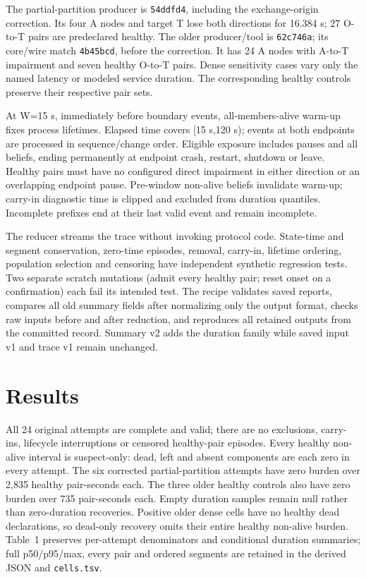 \documentclass[10pt]{article}
\begin{document}
The partial-partition producer is \texttt{54ddfd4}, including the exchange-origin
correction. Its four A nodes and target T lose both directions for 16.384 s;
27 O-to-T pairs are predeclared healthy. The older producer/tool is
\texttt{62c746a}; its core/wire match \texttt{4b45bcd}, before the correction.
It has 24 A nodes with A-to-T impairment and seven healthy O-to-T pairs. Dense
sensitivity cases vary only the named latency or modeled service duration.
The corresponding healthy controls preserve their respective pair sets.

At W=15 s, immediately before boundary events, all-members-alive warm-up fixes
process lifetimes. Elapsed time covers [15 s,120 s); events at both endpoints
are processed in sequence/change order. Eligible exposure includes pauses and
all beliefs, ending permanently at endpoint crash, restart, shutdown or leave.
Healthy pairs must have no configured direct impairment in either direction or
an overlapping endpoint pause. Pre-window non-alive beliefs invalidate warm-up;
carry-in diagnostic time is clipped and excluded from duration quantiles.
Incomplete prefixes end at their last valid event and remain incomplete.

The reducer streams the trace without invoking protocol code. State-time and
segment conservation, zero-time episodes, removal, carry-in, lifetime ordering,
population selection and censoring have independent synthetic regression tests.
Two separate scratch mutations (admit every healthy pair; reset onset on a
confirmation) each fail its intended test. The recipe validates saved reports,
compares all old summary fields after normalizing only the output format,
checks raw inputs before and after reduction, and reproduces all retained
outputs from the committed record. Summary v2 adds the duration family while
saved input v1 and trace v1 remain unchanged.

\section{Results}

All 24 original attempts are complete and valid; there are no exclusions,
carry-ins, lifecycle interruptions or censored healthy-pair episodes. Every
healthy non-alive interval is suspect-only: dead, left and absent components
are each zero in every attempt. The six corrected partial-partition attempts
have zero burden over 2,835 healthy pair-seconds each. The three older healthy
controls also have zero burden over 735 pair-seconds each. Empty duration samples
remain null rather than zero-duration recoveries. Positive older dense cells
have no healthy dead declarations, so dead-only recovery omits their entire
healthy non-alive burden. Table~1 preserves per-attempt denominators and
conditional duration summaries; full p50/p95/max, every pair and ordered
segments are retained in the derived JSON and \texttt{cells.tsv}.
\end{document}
